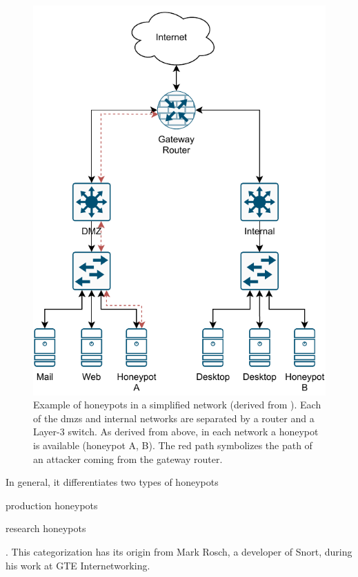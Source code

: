 \begin{figure}
    \centering
    \includegraphics{figures/honeypot-example.pdf}
    \caption[Example of honeypots in a simplified network]{
        Example of honeypots in a simplified network (derived from \cite{Spitzner2003}).
        Each of the \acp{dmz} and internal networks are separated by a router and a Layer-3 switch.
        As derived from above, in each network a honeypot is available (honeypot A, B).
        The red path symbolizes the path of an attacker coming from the gateway router.
    }
    \label{fig:honeypot-example}
\end{figure}

In general, it differentiates two types of honeypots
\begin{enumerate*}[label=(\roman*)]
    \item production honeypots
    \item research honeypots
\end{enumerate*}.
This categorization has its origin from Mark Rosch, a developer of Snort, during his work at GTE Internetworking. \cite{vetterl2020}


